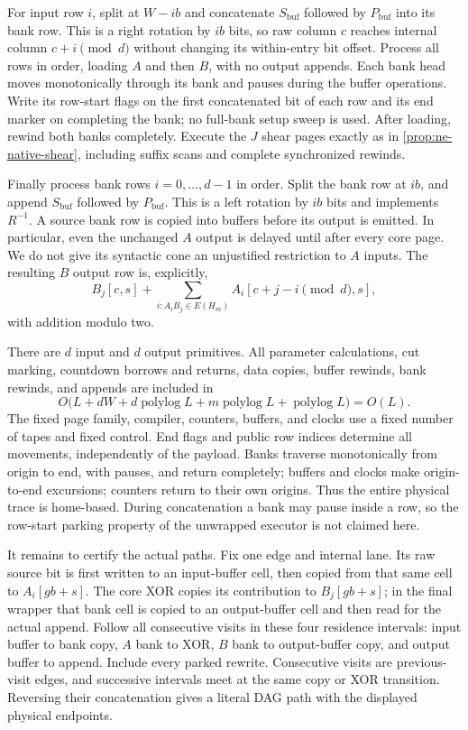 \begin{informalproof}
For input row $i$, split at $W-ib$ and concatenate $S_{\mathrm{buf}}$ followed
by $P_{\mathrm{buf}}$ into its bank row.  This is a right rotation by $ib$
bits, so raw column $c$ reaches internal column $c+i\pmod d$ without
changing its within-entry bit offset.  Process all rows in order, loading
$A$ and then $B$, with no output appends.  Each bank head moves monotonically
through its bank and pauses during the buffer operations.  Write its
row-start flags on the first concatenated bit of each row and its end
marker on completing the bank; no full-bank setup sweep is used.  After loading,
rewind both banks completely.  Execute the $J$ shear pages exactly as in
\cref{prop:ne-native-shear}, including suffix scans and complete
synchronized rewinds.

Finally process bank rows $i=0,\ldots,d-1$ in order.  Split the bank row
at $ib$, and append $S_{\mathrm{buf}}$ followed by $P_{\mathrm{buf}}$.  This is a
left rotation by $ib$ bits and implements $R^{-1}$.  A source bank row is
copied into buffers before its output is emitted.  In particular, even
the unchanged $A$ output is delayed until after every core page.  We do
not give its syntactic cone an unjustified restriction to $A$ inputs.
The resulting $B$ output row is, explicitly,
\[
 B_j[c,s]+\sum_{i:A_iB_j\in E(H_m)} A_i[c+j-i\pmod d,s],
\]
with addition modulo two.

There are $d$ input and $d$ output primitives.  All parameter calculations,
cut marking, countdown borrows and returns, data copies, buffer rewinds,
bank rewinds, and appends are included in
\[
 O\bigl(L+dW+d\operatorname{polylog}L
              +m\operatorname{polylog}L+\operatorname{polylog}L\bigr)
 =O(L).
\]
The fixed page family, compiler, counters, buffers, and clocks use a fixed
number of tapes and fixed control.  End flags and public row indices
determine all movements, independently of the payload.  Banks traverse
monotonically from origin to end, with pauses, and return completely;
buffers and clocks make origin-to-end excursions; counters return to their
own origins.  Thus the entire physical trace is home-based.  During
concatenation a bank may pause inside a row, so the row-start parking
property of the unwrapped executor is not claimed here.

It remains to certify the actual paths.  Fix one edge and internal lane.
Its raw source bit is first written to an input-buffer cell, then copied
from that same cell to $A_i[gb+s]$.  The core XOR copies its contribution
to $B_j[gb+s]$; in the final wrapper that bank cell is copied to an
output-buffer cell and then read for the actual append.  Follow all
consecutive visits in these four residence intervals: input buffer to
bank copy, $A$ bank to XOR, $B$ bank to output-buffer copy, and output
buffer to append.  Include every parked rewrite.  Consecutive visits
are previous-visit edges, and successive intervals meet at the same copy
or XOR transition.  Reversing their concatenation gives a literal DAG
path with the displayed physical endpoints.


\end{informalproof}
